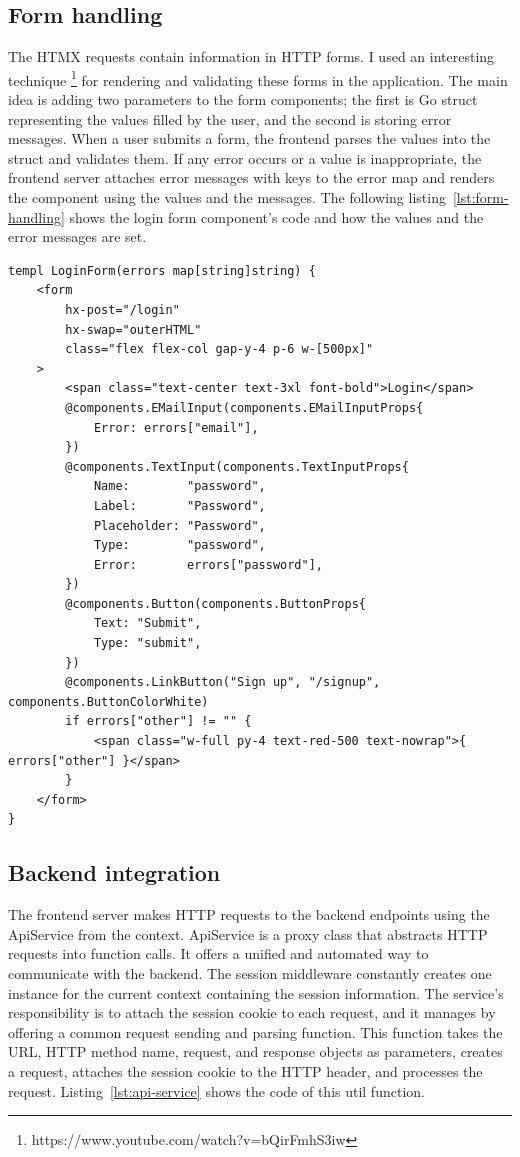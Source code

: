 \subsection{Form handling}

The HTMX requests contain information in HTTP forms. I used an interesting technique \footnote{https://www.youtube.com/watch?v=bQirFmhS3iw} for rendering and validating these forms in the application. The main idea is adding two parameters to the form components; the first is Go struct representing the values filled by the user, and the second is storing error messages. When a user submits a form, the frontend parses the values into the struct and validates them. If any error occurs or a value is inappropriate, the frontend server attaches error messages with keys to the error map and renders the component using the values and the messages. The following listing~\ref{lst:form-handling} shows the login form component's code and how the values and the error messages are set.

\begin{lstlisting}[caption=Login form,label=lst:form-handling]
templ LoginForm(errors map[string]string) {
	<form
		hx-post="/login"
		hx-swap="outerHTML"
		class="flex flex-col gap-y-4 p-6 w-[500px]"
	>
		<span class="text-center text-3xl font-bold">Login</span>
		@components.EMailInput(components.EMailInputProps{
			Error: errors["email"],
		})
		@components.TextInput(components.TextInputProps{
			Name:        "password",
			Label:       "Password",
			Placeholder: "Password",
			Type:        "password",
			Error:       errors["password"],
		})
		@components.Button(components.ButtonProps{
			Text: "Submit",
			Type: "submit",
		})
		@components.LinkButton("Sign up", "/signup", components.ButtonColorWhite)
		if errors["other"] != "" {
			<span class="w-full py-4 text-red-500 text-nowrap">{ errors["other"] }</span>
		}
	</form>
}
\end{lstlisting}

\subsection{Backend integration}

The frontend server makes HTTP requests to the backend endpoints using the ApiService from the context. ApiService is a proxy class that abstracts HTTP requests into function calls. It offers a unified and automated way to communicate with the backend. The session middleware constantly creates one instance for the current context containing the session information. The service's responsibility is to attach the session cookie to each request, and it manages by offering a common request sending and parsing function. This function takes the URL, HTTP method name, request, and response objects as parameters, creates a request, attaches the session cookie to the HTTP header, and processes the request. Listing~\ref{lst:api-service} shows the code of this util function.

